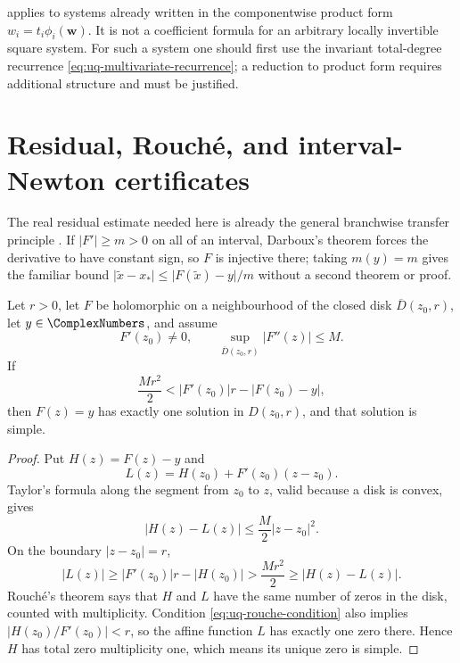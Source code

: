 \begin{remark}
\label{rem:uq-good-scope}
 applies to systems already written in the
componentwise product form \(w_i=t_i\phi_i(\bm w)\).  It is not a
coefficient formula for an arbitrary locally invertible square system.
For such a system one should first use the invariant total-degree recurrence
\eqref{eq:uq-multivariate-recurrence}; a reduction to product form requires
additional structure and must be justified.
\end{remark}

\section{Residual, Rouch\'e, and interval-Newton certificates}
\label{sec:uq-certificates}

The real residual estimate needed here is already the general branchwise
transfer principle .  If
\(\lvert F'\rvert\ge m>0\) on all of an interval, Darboux's theorem forces
the derivative to have constant sign, so \(F\) is injective there; taking
\(m(y)=m\) gives the familiar bound
\(
 \lvert\widetilde x-x_*\rvert
 \le \lvert F(\widetilde x)-y\rvert/m
\)
without a second theorem or proof.

\begin{theorem}
\label{thm:uq-rouche-disk-certificate}
Let \(r>0\), let \(F\) be holomorphic on a neighbourhood of the closed disk
\(\overline D(z_0,r)\), let \(y\in\ComplexNumbers\), and assume
\[
 F'(z_0)\ne0,\qquad
 \sup_{\overline D(z_0,r)}\lvert F''(z)\rvert\le M.
\]
If
\begin{equation}
\label{eq:uq-rouche-condition}
 \frac{Mr^2}{2}
 <
 \lvert F'(z_0)\rvert r-\lvert F(z_0)-y\rvert,
\end{equation}
then \(F(z)=y\) has exactly one solution in \(D(z_0,r)\), and that solution
is simple.
\end{theorem}

\begin{proof}
Put \(H(z)=F(z)-y\) and
\[
 L(z)=H(z_0)+F'(z_0)(z-z_0).
\]
Taylor's formula along the segment from \(z_0\) to \(z\), valid because a
disk is convex, gives
\[
 \lvert H(z)-L(z)\rvert\le\frac{M}{2}\lvert z-z_0\rvert^2.
\]
On the boundary \(\lvert z-z_0\rvert=r\),
\[
 \lvert L(z)\rvert
 \ge\lvert F'(z_0)\rvert r-\lvert H(z_0)\rvert
 >\frac{Mr^2}{2}
 \ge\lvert H(z)-L(z)\rvert.
\]
Rouch\'e's theorem says that \(H\) and \(L\) have the same number of zeros
in the disk, counted with multiplicity.  Condition
\eqref{eq:uq-rouche-condition} also implies
\(\lvert H(z_0)/F'(z_0)\rvert<r\), so the affine function \(L\) has exactly
one zero there.  Hence \(H\) has total zero multiplicity one, which means
its unique zero is simple.
\end{proof}

